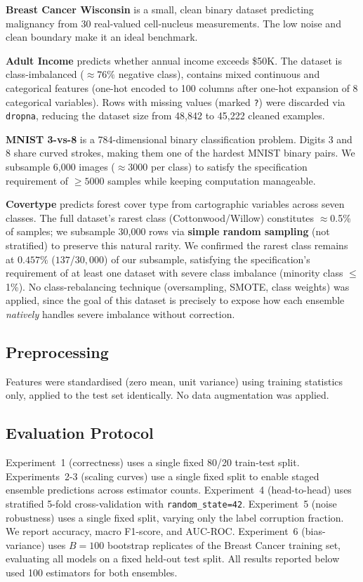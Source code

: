 \documentclass[conference]{IEEEtran}
\begin{document}
\textbf{Breast Cancer Wisconsin} is a small, clean binary dataset
predicting malignancy from 30 real-valued cell-nucleus measurements.
The low noise and clean boundary make it an ideal benchmark.

\textbf{Adult Income} predicts whether annual income exceeds \$50K.
The dataset is class-imbalanced (${\approx}76\%$ negative class),
contains mixed continuous and categorical features (one-hot encoded
to 100 columns after one-hot expansion of 8 categorical variables). Rows with missing values (marked \texttt{?})
were discarded via \texttt{dropna}, reducing the dataset size from 48,842 to
45,222 cleaned examples.

\textbf{MNIST 3-vs-8} is a 784-dimensional binary classification
problem.  Digits 3 and 8 share curved strokes, making them one of
the hardest MNIST binary pairs.  We subsample 6,000 images
(${\approx}3000$ per class) to satisfy the specification requirement
of $\ge 5000$ samples while keeping computation manageable.

\textbf{Covertype} predicts forest cover type from cartographic
variables across seven classes. The full dataset's rarest class
(Cottonwood/Willow) constitutes $\approx$0.5\% of samples; we
subsample 30{,}000 rows via \textbf{simple random sampling}
(not stratified) to preserve this natural rarity. We confirmed the
rarest class remains at $0.457\%$ ($137$/$30{,}000$) of our subsample, satisfying the specification's
requirement of at least one dataset with severe class imbalance
(minority class $\le$1\%). No class-rebalancing technique
(oversampling, SMOTE, class weights) was applied, since the goal of
this dataset is precisely to expose how each ensemble
\emph{natively} handles severe imbalance without correction.

\subsection{Preprocessing}
Features were standardised (zero mean, unit variance) using training
statistics only, applied to the test set identically.  No data
augmentation was applied.

\subsection{Evaluation Protocol}
Experiment~1 (correctness) uses a single fixed 80/20 train-test split.
Experiments~2-3 (scaling curves) use a single fixed split to enable
staged ensemble predictions across estimator counts.  Experiment~4
(head-to-head) uses stratified 5-fold cross-validation with
\texttt{random\_state=42}.  Experiment~5 (noise robustness) uses a
single fixed split, varying only the label corruption fraction.
We report accuracy, macro F1-score,
and AUC-ROC.  Experiment~6 (bias-variance) uses $B{=}100$ bootstrap
replicates of the Breast Cancer training set, evaluating all models
on a fixed held-out test split.  All results reported below used
100 estimators for both ensembles.
\end{document}
